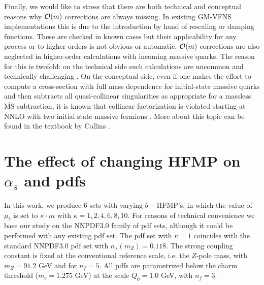 \documentclass[letter,11pt]{article}
\def\as{\alpha_s}
\def\nf{{n_f}}
\def\MSbar{\overline{\mathrm{MS}}}
\def\mub{\mu_b}
\def\k{\kappa}
\begin{document}
Finally, we would like to stress that there are both technical and conceptual reasons why ${\cal O}(m)$ corrections are always missing. In existing GM-VFNS implementations this is due to the introduction by hand of rescaling or damping functions. These are checked in known cases but their applicability for any process or to higher-orders is not obvious or automatic. ${\cal O}(m)$ corrections are also neglected in higher-order calculations with incoming massive quarks. The reason for this is twofold: on the technical side such calculations are uncommon and technically challenging \cite{Kretzer:1998ju}. On the conceptual side, even if one makes the effort to compute a cross-section with full mass dependence for initial-state massive quarks and then subtracts all quasi-collinear singularities as appropriate for a massless $\MSbar$ subtraction, it is known that collinear factorization is violated starting at NNLO with two initial state massive fermions \cite{Doria:1980ak,DiLieto:1980nkq,Catani:1985xt}. More about this topic can be found in the textbook by Collins \cite{Collins:2011zzd}.





\section{The effect of changing HFMP on $\as$ and pdfs}


In this work, we produce 6 sets with varying $b-$HFMP's, in which the value of $\mub$ is set to $\k\cdot m$ with $\k=1,2,4,6,8,10$. For reasons of technical convenience we base our study on the NNPDF3.0 family of pdf sets, although it could be performed with any existing pdf set. The pdf set with $\k=1$ coincides with the standard NNPDF3.0 pdf set with $\as(m_Z)=0.118$. The strong coupling constant is fixed at the conventional reference scale, i.e. the $Z$-pole mass, with $m_Z=91.2$ GeV and for $\nf=5$. All pdfs are parametrized below the charm threshold ($m_c=1.275$ GeV) at the scale $Q_0=1.0$ GeV, with $\nf=3$. 
\end{document}

